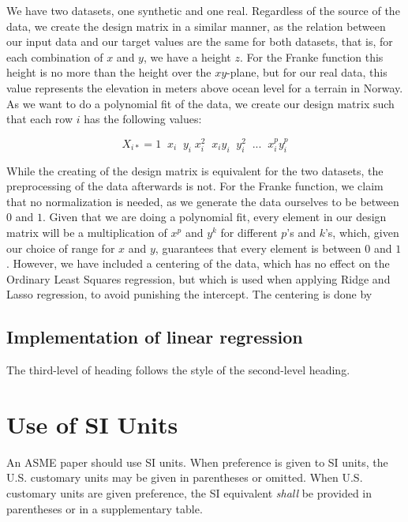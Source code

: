 \documentclass[twocolumn,10pt]{asme2ej}
\begin{document}
We have two datasets, one synthetic and one real. Regardless of the source of the data, we create the design matrix in a similar manner, as the relation between our input data and our target values are the same for both datasets, that is, for each combination of $x$ and $y$, we have a height $z$. For the Franke function this height is no more than the height over the $xy$-plane, but for our real data, this value represents the elevation in meters above ocean level for a terrain in Norway. As we want to do a polynomial fit of the data, we create our design matrix such that each row $i$ has the following values:

\[ X_{i*} = 1 \;\; x_i \;\; y_i \; x_i^2 \;\; x_i y_i \;\; y_i^2 \;\; ... \;\; x_i^p y_i^p\]

While the creating of the design matrix is equivalent for the two datasets, the preprocessing of the data afterwards is not. For the Franke function, we claim that no normalization is needed, as we generate the data ourselves to be between $0$ and $1$. Given that we are doing a polynomial fit, every element in our design matrix will be a multiplication of $x^p$ and $y^k$ for different $p$'s and $k$'s, which, given our choice of range for $x$ and $y$, guarantees that every element is between $0$ and $1$. However, we have included a centering of the data, which has no effect on the Ordinary Least Squares regression, but which is used when applying Ridge and Lasso regression, to avoid punishing the intercept. The centering is done by


\subsection{Implementation of linear regression}

The third-level of heading follows the style of the second-level heading.


\section{Use of SI Units}

An ASME paper should use SI units.  When preference is given to SI units, the U.S. customary units may be given in parentheses or omitted. When U.S. customary units are given preference, the SI equivalent {\em shall} be provided in parentheses or in a supplementary table. 
\end{document}
